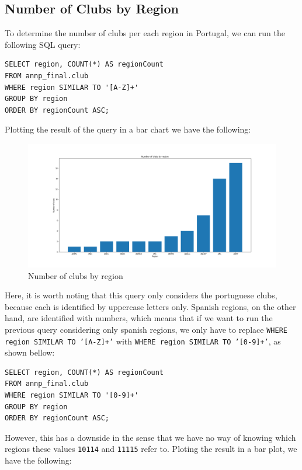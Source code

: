 \subsection{Number of Clubs by Region}\label{subsec:number-of-clubs-by-region}

To determine the number of clubs per each region in Portugal, we can run the following SQL query:

\begin{verbatim}
SELECT region, COUNT(*) AS regionCount
FROM annp_final.club
WHERE region SIMILAR TO '[A-Z]+'
GROUP BY region
ORDER BY regionCount ASC;
\end{verbatim}

Plotting the result of the query in a bar chart we have the following:

\begin{figure}[H]
    \centering
    \includegraphics[width=.85\textwidth]{img/clubsbyregion}
    \caption{Number of clubs by region}
    \label{fig:clubs-by-region}
\end{figure}

Here, it is worth noting that this query only considers the portuguese clubs, because each is identified by uppercase
letters only.
Spanish regions, on the other hand, are identified with numbers, which means that if we want to run the previous query
considering only spanish regions, we only have to replace \texttt{WHERE region SIMILAR TO '[A-Z]+'} with
\texttt{WHERE region SIMILAR TO '[0-9]+'}, as shown bellow:

\begin{verbatim}
SELECT region, COUNT(*) AS regionCount
FROM annp_final.club
WHERE region SIMILAR TO '[0-9]+'
GROUP BY region
ORDER BY regionCount ASC;
\end{verbatim}

However, this has a downside in the sense that we have no way of knowing which regions these values \texttt{10114} and
\texttt{11115} refer to.
Ploting the result in a bar plot, we have the following:

